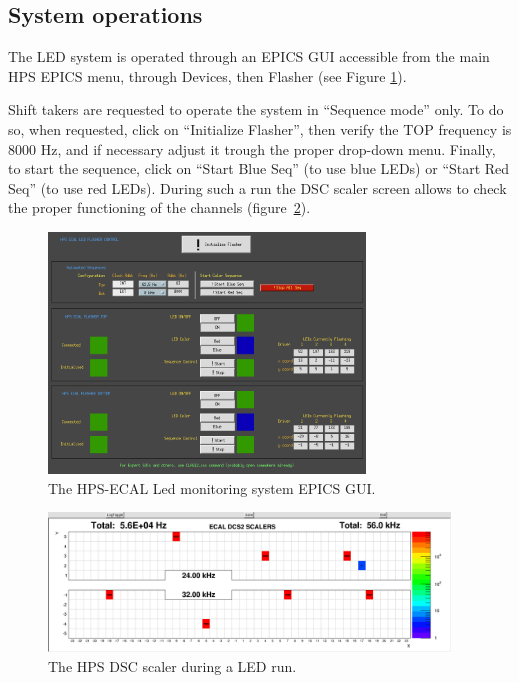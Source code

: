 \documentclass[12pt]{article}
\begin{document}
      \subsection{System operations}
      
      The LED system is operated through an EPICS GUI accessible from the main HPS EPICS menu, through Devices, then Flasher (see Figure \ref{FlasherMEDM}).

Shift takers are requested to operate the system in ``Sequence mode'' only. To do so, when requested, click on ``Initialize Flasher'', then verify the TOP frequency is 8000 Hz, and if necessary adjust it trough the proper drop-down menu. Finally, to start the sequence, click on ``Start Blue Seq'' (to use blue LEDs) or ``Start Red Seq'' (to use red LEDs). During such a run the DSC scaler screen allows to check the proper functioning of the channels (figure~\ref{LEDScalers}). 

\begin{figure}[htbp]
\center
\includegraphics[width=0.75\textwidth]{pics/FlasherMEDM.png}
\caption{\small \label{FlasherMEDM} The HPS-ECAL Led monitoring system EPICS GUI.}
\end{figure}
\begin{figure}[htbp]
\center
\includegraphics[width=0.95\textwidth]{pics/DSCScalersLED_2014_12_20.png}
\caption{\small \label{LEDScalers} The HPS DSC scaler during a LED run.}
\end{figure}
\end{document}
